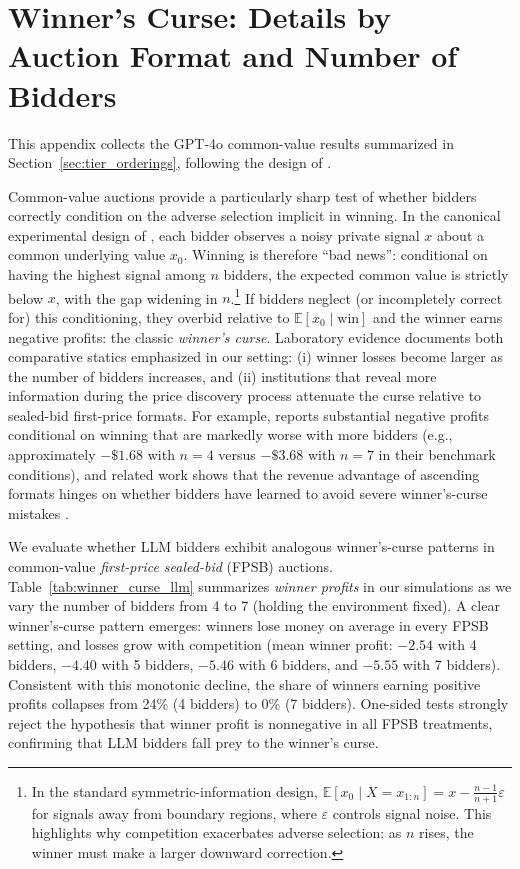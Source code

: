 \documentclass{article} %
\newif\ifmarkrev
\newcommand{\rev}[1]{\ifmarkrev\begingroup\color{red}#1\endgroup\else#1\fi}
\begin{document}
\section{\texorpdfstring{\rev{Winner's Curse: Details by Auction Format and Number of Bidders}}{Winner's Curse: Details by Auction Format and Number of Bidders}}\label{app:winners_curse}

\rev{This appendix collects the GPT-4o common-value results summarized in Section~\ref{sec:tier_orderings}, following the design of \citet{kagel1986winner}.}

Common-value auctions provide a particularly sharp test of whether bidders correctly condition on the adverse selection implicit in winning. In the canonical experimental design of \citet{kagel1986winner}, each bidder observes a noisy private signal $x$ about a common underlying value $x_0$. Winning is therefore ``bad news'': conditional on having the highest signal among $n$ bidders, the expected common value is strictly below $x$, with the gap widening in $n$.\footnote{In the standard symmetric-information design, $\mathbb{E}[x_0 \mid X=x_{1:n}] = x - \frac{n-1}{n+1}\varepsilon$ for signals away from boundary regions, where $\varepsilon$ controls signal noise. This highlights why competition exacerbates adverse selection: as $n$ rises, the winner must make a larger downward correction.} If bidders neglect (or incompletely correct for) this conditioning, they overbid relative to $\mathbb{E}[x_0\mid \text{win}]$ and the winner earns negative profits: the classic \emph{winner's curse}. Laboratory evidence documents both comparative statics emphasized in our setting: (i) winner losses become larger as the number of bidders increases, and (ii) institutions that reveal more information during the price discovery process attenuate the curse relative to sealed-bid first-price formats. For example, \citet{kagel1986winner} reports substantial negative profits conditional on winning that are markedly worse with more bidders (e.g., approximately $-\$1.68$ with $n=4$ versus $-\$3.68$ with $n=7$ in their benchmark conditions), and related work shows that the revenue advantage of ascending formats hinges on whether bidders have learned to avoid severe winner's-curse mistakes \citep{levin1996revenue}.

We evaluate whether LLM bidders exhibit analogous winner's-curse patterns in common-value \emph{first-price sealed-bid} (FPSB) auctions. Table~\ref{tab:winner_curse_llm} summarizes \emph{winner profits} in our simulations as we vary the number of bidders from 4 to 7 (holding the environment fixed). A clear winner’s-curse pattern emerges: winners lose money on average in every FPSB setting, and losses grow with competition (mean winner profit: $-2.54$ with 4 bidders, $-4.40$ with 5 bidders, $-5.46$ with 6 bidders, and $-5.55$ with 7 bidders). Consistent with this monotonic decline, the share of winners earning positive profits collapses from 24\% (4 bidders) to 0\% (7 bidders). One-sided tests strongly reject the hypothesis that winner profit is nonnegative in all FPSB treatments, confirming that LLM bidders fall prey to the winner’s curse\citep{kagel1986winner}.
\end{document}
